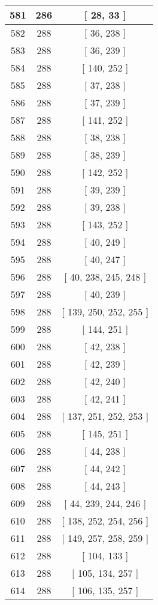 \begin{center}
\begin{longtable}[H]{|| c c c ||}
\\\hline
581 & 286 & [ 28, 33 ]
\\\hline
582 & 288 & [ 36, 238 ]
\\\hline
583 & 288 & [ 36, 239 ]
\\\hline
584 & 288 & [ 140, 252 ]
\\\hline
585 & 288 & [ 37, 238 ]
\\\hline
586 & 288 & [ 37, 239 ]
\\\hline
587 & 288 & [ 141, 252 ]
\\\hline
588 & 288 & [ 38, 238 ]
\\\hline
589 & 288 & [ 38, 239 ]
\\\hline
590 & 288 & [ 142, 252 ]
\\\hline
591 & 288 & [ 39, 239 ]
\\\hline
592 & 288 & [ 39, 238 ]
\\\hline
593 & 288 & [ 143, 252 ]
\\\hline
594 & 288 & [ 40, 249 ]
\\\hline
595 & 288 & [ 40, 247 ]
\\\hline
596 & 288 & [ 40, 238, 245, 248 ]
\\\hline
597 & 288 & [ 40, 239 ]
\\\hline
598 & 288 & [ 139, 250, 252, 255 ]
\\\hline
599 & 288 & [ 144, 251 ]
\\\hline
600 & 288 & [ 42, 238 ]
\\\hline
601 & 288 & [ 42, 239 ]
\\\hline
602 & 288 & [ 42, 240 ]
\\\hline
603 & 288 & [ 42, 241 ]
\\\hline
604 & 288 & [ 137, 251, 252, 253 ]
\\\hline
605 & 288 & [ 145, 251 ]
\\\hline
606 & 288 & [ 44, 238 ]
\\\hline
607 & 288 & [ 44, 242 ]
\\\hline
608 & 288 & [ 44, 243 ]
\\\hline
609 & 288 & [ 44, 239, 244, 246 ]
\\\hline
610 & 288 & [ 138, 252, 254, 256 ]
\\\hline
611 & 288 & [ 149, 257, 258, 259 ]
\\\hline
612 & 288 & [ 104, 133 ]
\\\hline
613 & 288 & [ 105, 134, 257 ]
\\\hline
614 & 288 & [ 106, 135, 257 ]
\\\hline

\end{longtable}
\end{center}
